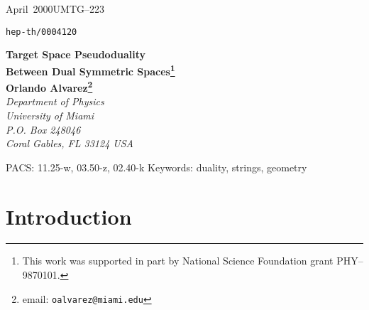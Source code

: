 \documentclass[a4paper,12pt]{article}
\newcommand{\Mtil}{\widetilde{M}}
\begin{document}
\begin{titlepage}
\mbox{April 2000}\hfill\mbox{UMTG--223}\newline
\strut\hfill\mbox{\tt hep-th/0004120}
\par\vspace{.5in}
\begin{center}
    {\bf\large Target Space Pseudoduality}\\
    {\bf\large Between Dual Symmetric Spaces\footnote{This work
    was supported in part by National Science Foundation grant
    PHY--9870101.}}\\[.4in]
    {\bf Orlando Alvarez\footnote{email: 
    \texttt{oalvarez@miami.edu}}}\\
    {\em Department of Physics}\\
    {\em University of Miami}\\
    {\em P.O. Box 248046}\\
    {\em Coral Gables, FL 33124 USA}\\
\end{center}

\vspace{.5in}
\begin{abstract}
A  set of on shell duality equations is proposed that leads to a
map between strings moving on symmetric spaces with opposite
curvatures.  The transformation maps ``waves'' on a riemannian
symmetric space $M$ to ``waves'' on its dual riemannian symmetric
space $\Mtil$.  This transformation preserves the energy momentum
tensor though it is not a canonical transformation.  The preservation
of the energy momentum tensor has a natural geometrical
interpretation. The transformation maps ``particle-like solutions'' into 
static ``soliton-like solutions''. The results presented here 
generalize earlier results of E.~Ivanov.
\end{abstract}

\vspace{.5in}
\noindent
PACS: 11.25-w, 03.50-z, 02.40-k\newline
Keywords: duality, strings, geometry

\end{titlepage}

\section{Introduction}
\label{sec:intro}
\end{document}
